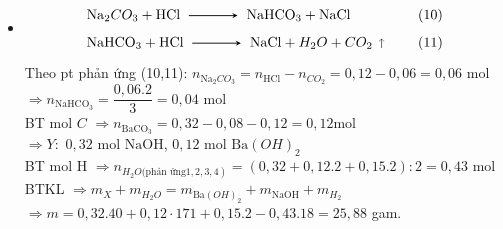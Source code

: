 \begin{vd}
{\begin{itemize}
\begin{itemize}
\[\begin{array}{ll}
							\mathrm{Na}_2 CO_3+2 \mathrm{HCl} \xrightarrow 2 \mathrm{NaCl}+H_2 O+CO_2 \uparrow &\quad \left(8\right)\quad\left(n_{\mathrm{HCl}}: n_{CO_2}=2\right) \\
							\mathrm{NaHCO}_3+\mathrm{HCl} \xrightarrow \mathrm{NaCl}+H_2 O+CO_2 \uparrow & \quad \left(9\right)\quad\left(n_{\mathrm{HCl}}: n_{CO_2}=1\right)
						\end{array}
					\]
				Theo đề: $n_{\mathrm{HCl}}: n_{CO_2}=0,12: 0,075=1,6\Rightarrow \dfrac{n_{\mathrm{NaHCO}_3}}{n_{\mathrm{Na}_2 CO_3}}=\dfrac{2-1,6}{1,6-1}=\dfrac{2}{3}$
				\item {}
				\[
				\begin{aligned}
						& \mathrm{Na}_2 CO_3+\mathrm{HCl} \xrightarrow \mathrm{NaHCO}_3+\mathrm{NaCl} &\quad \left(10\right)\\
						& \mathrm{NaHCO}_3+\mathrm{HCl} \xrightarrow \mathrm{NaCl}+H_2 O+CO_2 \uparrow &\quad \left(11\right)
					\end{aligned}
				\]
				Theo pt phản ứng (10,11): $n_{\mathrm{Na}_2 CO_3}=n_{\mathrm{HCl}}-n_{CO_2}=0,12-0,06=0,06$  $\mathrm{mol}$
				\\
				$\Rightarrow n_{\mathrm{NaHCO}_3}=\dfrac{0,06.2}{3}=0,04$  $\mathrm{mol}$
				\\
				BT mol $C$ $\Rightarrow n_{\mathrm{BaCO}_3}=0,32-0,08-0,12=0,12\mathrm{mol}$
				\\
				$\Rightarrow Y:$ $0,32$ $\mathrm{mol}$ $\mathrm{NaOH}$, $0,12$
				 $\mathrm{mol}$ $\mathrm{Ba}(OH)_2$
				\\
				BT mol H $\Rightarrow n_{\left.H_2O\text{(phản ứng} 1,2,3,4\right)}=(0,32+0,12.2+0,15.2): 2=0,43$ $\mathrm{mol}$
				\\
				BTKL $\Rightarrow m_X+m_{H_2 O}=m_{\mathrm{Ba}(OH)_2}+m_{\mathrm{NaOH}}+m_{H_2}$
				\\
				$\Rightarrow m=0,32.40+0,12\cdot 171+0,15.2-0,43.18=25,88$ gam.
				\end{itemize}
			\end{itemize}
	}
\end{vd}

